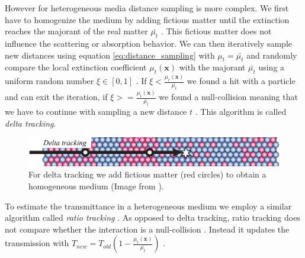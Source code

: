 However for heterogeneous media distance sampling is more complex.
We first have to homogenize the medium by adding fictious matter until the extinction reaches the majorant of the real matter $\bar{\mu_t}$ \cite[p. 6]{novak_overview}.
This fictious matter does not influence the scattering or absorption behavior.
We can then iteratively sample new distances using equation \ref{eq:distance_sampling} with $\mu_t=\bar{\mu_t}$ and randomly compare the local extinction coefficient $\mu_t(\boldsymbol{x})$ with the majorant $\bar{\mu_t}$ using a uniform random number $\xi\in[0,1]$ \cite[p. 5]{spectral_and_decomposition_tracking}.
If $\xi<\frac{\mu_t(\boldsymbol{x})}{\bar{\mu_t}}$ we found a hit with a particle and can exit the iteration, if $\xi>=\frac{\mu_t(\boldsymbol{x})}{\bar{\mu_t}}$ we found a null-collision meaning that we have to continue with sampling a new distance $t$ \cite[p. 5]{spectral_and_decomposition_tracking}.
This algorithm is called \textit{delta tracking}.
\begin{figure}[!ht]
    \centering
    \includegraphics[width=0.8\linewidth]{img/novak_delta_tracking.png}
    \caption{For delta tracking we add fictious matter (red circles) to obtain a homogeneous medium (Image from \cite[p. 6]{novak_overview}).}
    \label{fig:novak_delta_tracking}
\end{figure}
To estimate the transmittance in a heterogeneous medium we employ a similar algorithm called \textit{ratio tracking} \cite{novak_ratio_tracking}.
As opposed to delta tracking, ratio tracking does not compare whether the interaction is a null-collision \cite[p. 4]{novak_ratio_tracking}.
Instead it updates the transmission with $T_{new} = T_{old}(1 - \frac{\mu_t(\boldsymbol{x})}{\bar{\mu_t}})$ \cite[p. 4]{novak_ratio_tracking}.

